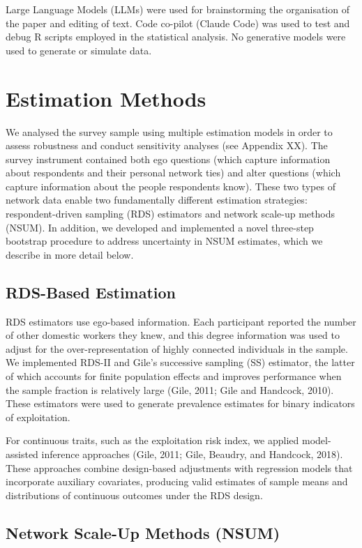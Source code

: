 \documentclass[
  12pt,
  letterpaper,
  DIV=11,
  numbers=noendperiod]{scrartcl}
\theoremstyle{plain}
\theoremstyle{definition}
\begin{document}
Large Language Models (LLMs) were used for brainstorming the
organisation of the paper and editing of text. Code co-pilot (Claude
Code) was used to test and debug R scripts employed in the statistical
analysis. No generative models were used to generate or simulate data.

\section{Estimation Methods}\label{estimation-methods}

We analysed the survey sample using multiple estimation models in order
to assess robustness and conduct sensitivity analyses (see Appendix XX).
The survey instrument contained both ego questions (which capture
information about respondents and their personal network ties) and alter
questions (which capture information about the people respondents know).
These two types of network data enable two fundamentally different
estimation strategies: respondent-driven sampling (RDS) estimators and
network scale-up methods (NSUM). In addition, we developed and
implemented a novel three-step bootstrap procedure to address
uncertainty in NSUM estimates, which we describe in more detail below.

\subsection{RDS-Based Estimation}\label{rds-based-estimation}

RDS estimators use ego-based information. Each participant reported the
number of other domestic workers they knew, and this degree information
was used to adjust for the over-representation of highly connected
individuals in the sample. We implemented RDS-II and Gile's successive
sampling (SS) estimator, the latter of which accounts for finite
population effects and improves performance when the sample fraction is
relatively large (Gile, 2011; Gile and Handcock, 2010). These estimators
were used to generate prevalence estimates for binary indicators of
exploitation.

For continuous traits, such as the exploitation risk index, we applied
model-assisted inference approaches (Gile, 2011; Gile, Beaudry, and
Handcock, 2018). These approaches combine design-based adjustments with
regression models that incorporate auxiliary covariates, producing valid
estimates of sample means and distributions of continuous outcomes under
the RDS design.

\subsection{Network Scale-Up Methods
(NSUM)}\label{network-scale-up-methods-nsum}
\end{document}
